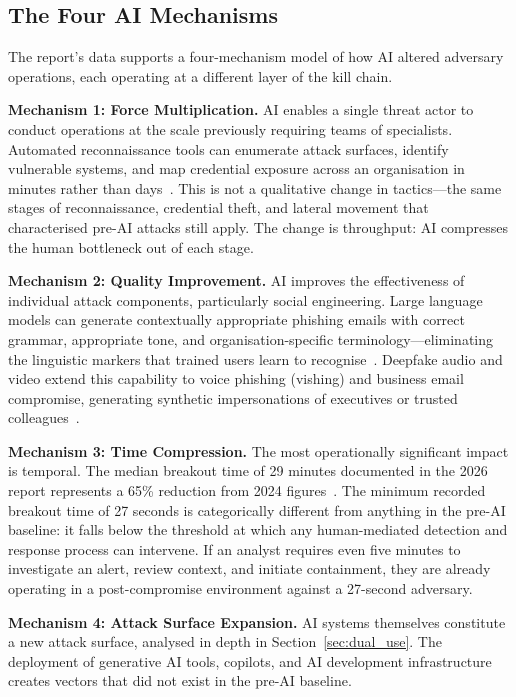 \documentclass[journal]{IEEEtran}
\begin{document}
\subsection{The Four AI Mechanisms}

The report's data supports a four-mechanism model of how AI altered adversary
operations, each operating at a different layer of the kill chain.

\textbf{Mechanism 1: Force Multiplication.} AI enables a single threat actor to
conduct operations at the scale previously requiring teams of specialists. Automated
reconnaissance tools can enumerate attack surfaces, identify vulnerable systems, and
map credential exposure across an organisation in minutes rather than
days~\cite{cs2026press}. This is not a qualitative change in tactics---the same
stages of reconnaissance, credential theft, and lateral movement that characterised
pre-AI attacks still apply. The change is throughput: AI compresses the human
bottleneck out of each stage.

\textbf{Mechanism 2: Quality Improvement.} AI improves the effectiveness of
individual attack components, particularly social engineering. Large language models
can generate contextually appropriate phishing emails with correct grammar,
appropriate tone, and organisation-specific terminology---eliminating the linguistic
markers that trained users learn to recognise~\cite{itpro2026}. Deepfake audio and
video extend this capability to voice phishing (vishing) and business email
compromise, generating synthetic impersonations of executives or trusted
colleagues~\cite{cs2026press}.

\textbf{Mechanism 3: Time Compression.} The most operationally significant impact
is temporal. The median breakout time of 29 minutes documented in the 2026 report
represents a 65\% reduction from 2024 figures~\cite{itpro2026}. The minimum recorded
breakout time of 27 seconds is categorically different from anything in the pre-AI
baseline: it falls below the threshold at which any human-mediated detection and
response process can intervene. If an analyst requires even five minutes to
investigate an alert, review context, and initiate containment, they are already
operating in a post-compromise environment against a 27-second adversary.

\textbf{Mechanism 4: Attack Surface Expansion.} AI systems themselves constitute a
new attack surface, analysed in depth in Section~\ref{sec:dual_use}. The deployment
of generative AI tools, copilots, and AI development infrastructure creates vectors
that did not exist in the pre-AI baseline.
\end{document}
